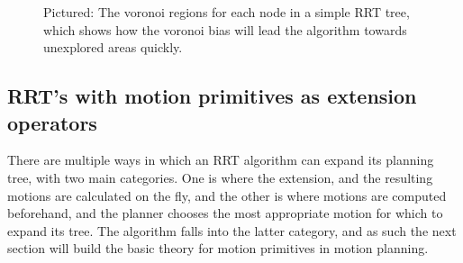 \begin{figure}
  \centering {}
  \caption{Pictured: The voronoi regions for each node in a simple RRT tree,
    which shows how the voronoi bias will lead the algorithm towards unexplored
    areas quickly.}
  \label{fig:rrt-voronoi}
\end{figure}

\begin{figure}
  
\end{figure}


\subsection{RRT's with motion primitives as extension operators}

There are multiple ways in which an \ac{RRT} algorithm can expand its planning
tree, with two main categories. One is where the extension, and the resulting
motions are calculated on the fly, and the other is where motions are computed
beforehand, and the planner chooses the most appropriate motion for which to
expand its tree. The \rrtfunnel{} algorithm falls into the latter category, and
as such the next section will build the basic theory for motion primitives in
motion planning.

